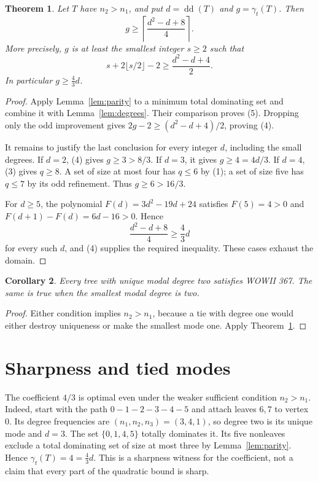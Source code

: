 \documentclass[11pt,a4paper]{article}
\newtheorem{theorem}{Theorem}
\newtheorem{corollary}[theorem]{Corollary}
\newcommand{\gt}{\gamma_t}
\newcommand{\dd}{\operatorname{dd}}
\begin{document}
\begin{theorem}\label{thm:main}
Let $T$ have $n_2>n_1$, and put $d=\dd(T)$ and $g=\gt(T)$. Then
\[
 g\ge\left\lceil\frac{d^2-d+8}{4}\right\rceil.
 \tag{4}
\]
More precisely, $g$ is at least the smallest integer $s\ge2$ such that
\[
 s+2\lfloor s/2\rfloor-2\ge\frac{d^2-d+4}{2}. \tag{5}
\]
In particular $g\ge\tfrac43 d$.
\end{theorem}
\begin{proof}
Apply Lemma~\ref{lem:parity} to a minimum total dominating set and combine it with Lemma~\ref{lem:degrees}. Their comparison proves (5). Dropping only the odd improvement gives $2g-2\ge(d^2-d+4)/2$, proving (4).

It remains to justify the last conclusion for every integer $d$, including the small degrees. If $d=2$, (4) gives $g\ge3>8/3$. If $d=3$, it gives $g\ge4=4d/3$. If $d=4$, (3) gives $q\ge8$. A set of size at most four has $q\le6$ by (1); a set of size five has $q\le7$ by its odd refinement. Thus $g\ge6>16/3$.

For $d\ge5$, the polynomial $F(d)=3d^2-19d+24$ satisfies $F(5)=4>0$ and $F(d+1)-F(d)=6d-16>0$. Hence
\[
 \frac{d^2-d+8}{4}\ge\frac43d
\]
for every such $d$, and (4) supplies the required inequality. These cases exhaust the domain.
\end{proof}

\begin{corollary}
Every tree with unique modal degree two satisfies WOWII 367. The same is true when the smallest modal degree is two.
\end{corollary}
\begin{proof}
Either condition implies $n_2>n_1$, because a tie with degree one would either destroy uniqueness or make the smallest mode one. Apply Theorem~\ref{thm:main}.
\end{proof}

\section{Sharpness and tied modes}
The coefficient $4/3$ is optimal even under the weaker sufficient condition $n_2>n_1$. Indeed, start with the path $0-1-2-3-4-5$ and attach leaves $6,7$ to vertex $0$. Its degree frequencies are $(n_1,n_2,n_3)=(3,4,1)$, so degree two is its unique mode and $d=3$. The set $\{0,1,4,5\}$ totally dominates it. Its five nonleaves exclude a total dominating set of size at most three by Lemma~\ref{lem:parity}. Hence $\gt(T)=4=\tfrac43d$. This is a sharpness witness for the coefficient, not a claim that every part of the quadratic bound is sharp.
\end{document}
